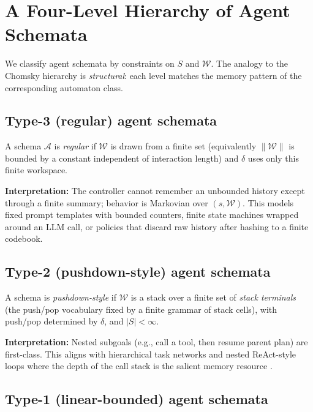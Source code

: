 \section{A Four-Level Hierarchy of Agent Schemata}
\label{sec:hierarchy}

We classify agent schemata by constraints on $S$ and $\mathcal{W}$. The analogy to the Chomsky hierarchy is \emph{structural}: each level matches the memory pattern of the corresponding automaton class.

\subsection{Type-3 (regular) agent schemata}

\begin{definition}
\label{def:type3}
A schema $\mathcal{A}$ is \emph{regular} if $\mathcal{W}$ is drawn from a finite set (equivalently $\lVert \mathcal{W} \rVert$ is bounded by a constant independent of interaction length) and $\delta$ uses only this finite workspace.
\end{definition}

\textbf{Interpretation:} The controller cannot remember an unbounded history except through a finite summary; behavior is Markovian over $(s,\mathcal{W})$. This models fixed prompt templates with bounded counters, finite state machines wrapped around an LLM call, or policies that discard raw history after hashing to a finite codebook.

\subsection{Type-2 (pushdown-style) agent schemata}

\begin{definition}
\label{def:type2}
A schema is \emph{pushdown-style} if $\mathcal{W}$ is a stack over a finite set of \emph{stack terminals} (the push/pop vocabulary fixed by a finite grammar of stack cells), with push/pop determined by $\delta$, and $|S| < \infty$.
\end{definition}

\textbf{Interpretation:} Nested subgoals (e.g., call a tool, then resume parent plan) are first-class. This aligns with hierarchical task networks and nested ReAct-style loops where the depth of the call stack is the salient memory resource \citep{react2023}.

\subsection{Type-1 (linear-bounded) agent schemata}

